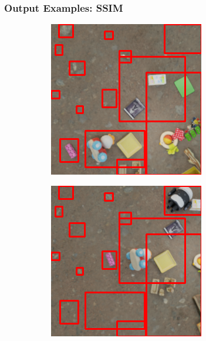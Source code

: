 \documentclass[13.5pt,aspecratio=169, xcolor=dvipsnames]{beamer}
\begin{document}
\begin{frame}
    \onehalfspacing
        \frametitle{Output Examples: SSIM}    
        \begin{figure}
            \begin{subfigure}{0.5\textwidth}
              \centering
              \includegraphics[width=\linewidth]{Example/Output/SSIM_1.png}
              \captionsetup{labelformat=empty}
            \end{subfigure}%
            \begin{subfigure}{0.5\textwidth}
              \centering
              \includegraphics[width=\linewidth]{Example/Output/SSIM_1_2.png}
              \captionsetup{labelformat=empty}
            \end{subfigure}
            \captionsetup{labelformat=empty}
        \end{figure}


\end{frame}
\end{document}
